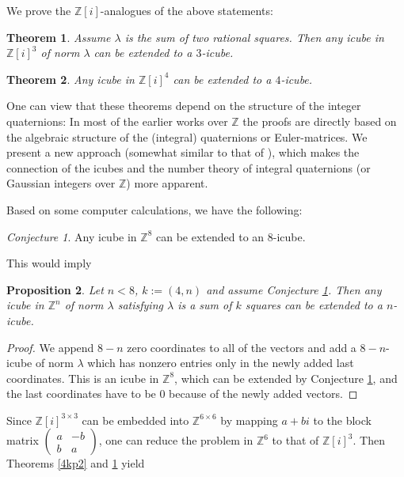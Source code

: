 \documentclass[11pt]{amsart}
\newcommand{\ZZ}{\mathbb{Z}}
\newtheorem{theorem}{Theorem}
\newtheorem{proposition}{Proposition}[section]
\theoremstyle{definition}
\theoremstyle{remark}
\newtheorem{conjecture}[proposition]{Conjecture}
\begin{document}
We prove the $\ZZ[i]$-analogues of the above statements:
\begin{theorem}\label{3Zi}
Assume $\lambda$ is the sum of two rational squares. Then any icube in $\ZZ[i]^3$ of norm $\lambda$ can be extended to a $3$-icube.
\end{theorem}

\begin{theorem}\label{4Zi}
Any icube in $\ZZ[i]^4$  can be extended to a $4$-icube.
\end{theorem}

One can view that these theorems depend on the structure of the integer quaternions: In most of the earlier works over $\mathbb Z$ the proofs are directly based on the algebraic structure of the (integral) quaternions or Euler-matrices. We present a new approach (somewhat similar to that of \cite{Horvath}), which makes the connection of the icubes and the number theory of integral quaternions (or Gaussian integers over $\mathbb Z$) more apparent.






Based on some computer calculations, we have the following:
\begin{conjecture}\label{con8i}
Any icube in $\ZZ^8$ can be extended to an $8$-icube.
\end{conjecture}

This would imply
\begin{proposition}
Let $n<8$, $k:=(4,n)$ and assume Conjecture \ref{con8i}. Then any icube in $\ZZ^n$ of norm $\lambda$ satisfying $\lambda$ is a sum of $k$ squares can be extended to a $n$-icube.
\end{proposition}
\begin{proof}
We append $8-n$ zero coordinates to all of the vectors and add a $8-n$-icube of norm $\lambda$ which has nonzero entries only in the newly added last coordinates. This is an icube in $\ZZ^8$, which can be extended by Conjecture \ref{con8i}, and the last coordinates have to be 0 because of the newly added vectors.
\end{proof}


Since $\mathbb Z[i]^{3\times 3}$ can be embedded into $\mathbb Z^{6\times 6}$ by mapping $a+bi$ to the block matrix $\left(\begin{smallmatrix}a & -b \\ b & a\end{smallmatrix}\right)$, one can reduce the problem in $\mathbb Z^6$ to that of $\mathbb Z[i]^3$. Then Theorems \ref{4kp2} and \ref{3Zi} yield
\end{document}
